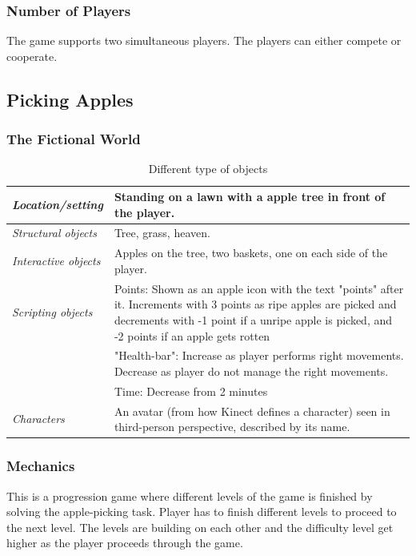 \subsubsection{Number of Players}
The game supports two simultaneous players. The players can either compete or cooperate.

\subsection{Picking Apples}

\subsubsection{The Fictional World} 

\begin{table} [H]
\centering
\begin{tabular}{|p{}|p{}|}
\hline
\emph{Location/setting} & Standing on a lawn with a apple tree in front of the player. \\ \hline
\emph{Structural objects} & Tree, grass, heaven.  \\ \hline
\emph{Interactive objects} & Apples on the tree, two baskets, one on each side of the player. \\ \hline
\emph{Scripting objects} &  Points: Shown as an apple icon with the text "points" after it. Increments with 3 points as ripe apples are picked and decrements with -1 point if a unripe apple is picked, and -2 points if an apple gets rotten \\ \cline{2-2}
& "Health-bar": Increase as player performs right  movements. Decrease as player do not manage the right  movements.  \\ \cline{2-2}
& Time: Decrease from 2 minutes \\ \hline
\emph{Characters} & An avatar (from how Kinect defines a character) seen in third-person perspective, described by its name. \\ \hline
\end{tabular}
\caption[Various objects in the "Picking Apples" game]{Different type of objects}
\label{tab:objects2}
\end{table}  
 
\subsubsection{Mechanics} 
This is a progression game where different levels of the game is finished by solving the apple-picking task. Player has to finish different levels to proceed to the next level. The levels are building on each other and the difficulty level get higher as the player proceeds through the game.

